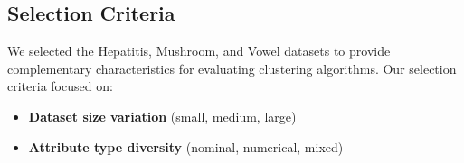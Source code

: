 

\subsection{Selection Criteria}
We selected the Hepatitis, Mushroom, and Vowel datasets to provide complementary characteristics for evaluating clustering algorithms. Our selection criteria focused on:

\begin{itemize}
    \item \textbf{Dataset size variation} (small, medium, large)
    \item \textbf{Attribute type diversity} (nominal, numerical, mixed)
\end{itemize}





